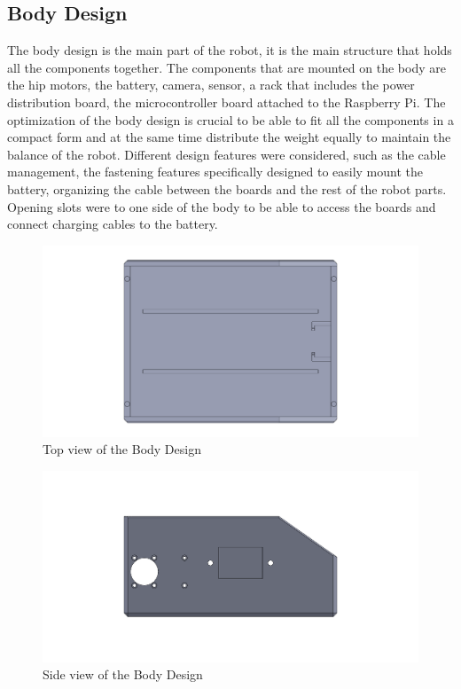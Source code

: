 \subsection{Body Design}
The body design is the main part of the robot, it is the main structure that holds all the components together.
The components that are mounted on the body are the hip motors, the battery, camera, sensor, a rack that includes the power distribution board, the microcontroller board attached to the Raspberry Pi. The optimization of the body design is crucial to be able to fit all the components in a compact form and at the same time distribute the weight equally to maintain the balance of the robot.
Different design features were considered, such as the cable management, the fastening features specifically designed to easily mount the battery, organizing the cable between the boards and the rest of the robot parts.
Opening slots were to one side of the body to be able to access the boards and connect charging cables to the battery.
\begin{figure}[h]
	\centering
	\includegraphics[width=1\linewidth]{Body_Design_1}
	\caption[Top view of the Body Design]{Top view of the Body Design}
	\label{fig:bodydesign1}
\end{figure}
\begin{figure}[h]
	\centering
	\includegraphics[width=1\linewidth]{Body_Design_2}
	\caption[Side view of the Body Design]{Side view of the Body Design}
	\label{fig:bodydesign2}
\end{figure}
